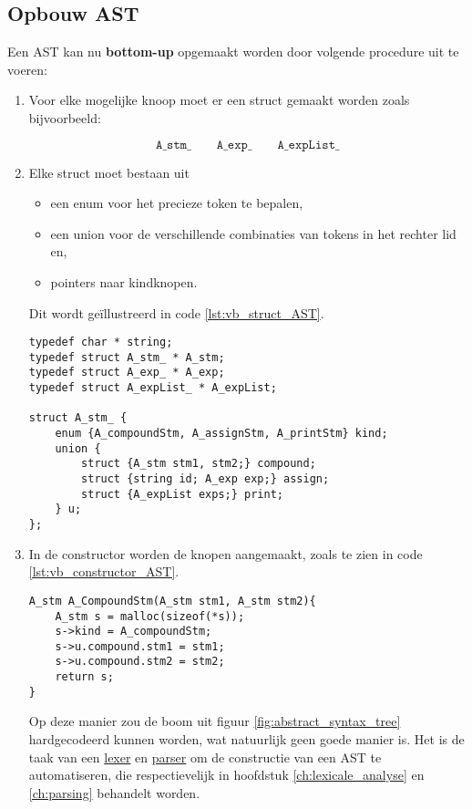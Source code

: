 \subsection{Opbouw AST}
Een AST kan nu \textbf{bottom-up} opgemaakt worden door volgende procedure uit te voeren:
\begin{enumerate}
	\item Voor elke mogelijke knoop moet er een struct gemaakt worden zoals bijvoorbeeld:
	
	$$\texttt{A\_stm\_} \qquad \texttt{A\_exp\_} \qquad \texttt{A\_expList\_}$$
	
	\item Elke struct moet bestaan uit
	\begin{itemize}
		\item een enum voor het precieze token te bepalen,
		\item een union voor de verschillende combinaties van tokens in het rechter lid en,
		\item pointers naar kindknopen.
	\end{itemize}
	Dit wordt geïllustreerd in code \ref{lst:vb_struct_AST}.
	\begin{lstlisting}[caption={Voorbeeld van een struct voor een AST.},label={lst:vb_struct_AST}, captionpos=b]
typedef char * string;
typedef struct A_stm_ * A_stm;
typedef struct A_exp_ * A_exp;
typedef struct A_expList_ * A_expList;

struct A_stm_ {
	enum {A_compoundStm, A_assignStm, A_printStm} kind;
	union {
		struct {A_stm stm1, stm2;} compound;
		struct {string id; A_exp exp;} assign;
		struct {A_expList exps;} print;
	} u;
};
	\end{lstlisting}
	\item In de constructor worden de knopen aangemaakt, zoals te zien in code \ref{lst:vb_constructor_AST}.
	\begin{lstlisting}[caption={Voorbeeld van een constructor voor een AST.},label={lst:vb_constructor_AST}, captionpos=b]
A_stm A_CompoundStm(A_stm stm1, A_stm stm2){
	A_stm s = malloc(sizeof(*s));
	s->kind = A_compoundStm;
	s->u.compound.stm1 = stm1;
	s->u.compound.stm2 = stm2;
	return s;
}
	\end{lstlisting}
	

Op deze manier zou de boom uit figuur \ref{fig:abstract_syntax_tree} hardgecodeerd kunnen worden, wat natuurlijk geen goede manier is. Het is de taak van een \uline{lexer} en \uline{parser} om de constructie van een AST te automatiseren, die respectievelijk in hoofdstuk \ref{ch:lexicale_analyse} en \ref{ch:parsing} behandelt worden.


\end{enumerate}
